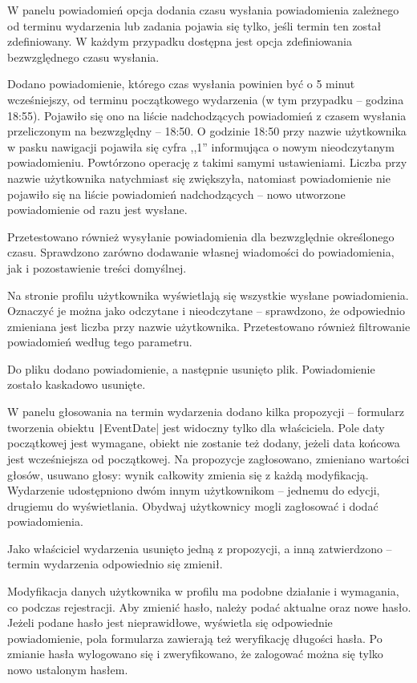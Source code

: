 \documentclass[a4paper,twoside,12pt]{book}
\begin{document}
W panelu powiadomień opcja dodania czasu wysłania powiadomienia zależnego od terminu wydarzenia lub zadania pojawia się tylko, jeśli termin ten został zdefiniowany. W każdym przypadku dostępna jest opcja zdefiniowania bezwzględnego czasu wysłania. 

Dodano powiadomienie, którego czas wysłania powinien być o 5 minut wcześniejszy, od terminu początkowego wydarzenia (w tym przypadku -- godzina 18:55). Pojawiło się ono na liście nadchodzących powiadomień z czasem wysłania przeliczonym na bezwzględny -- 18:50. O godzinie 18:50 przy nazwie użytkownika w pasku nawigacji pojawiła się cyfra ,,1'' informująca o nowym nieodczytanym powiadomieniu. Powtórzono operację z takimi samymi ustawieniami. Liczba przy nazwie użytkownika natychmiast się zwiększyła, natomiast powiadomienie nie pojawiło się na liście powiadomień nadchodzących -- nowo utworzone powiadomienie od razu jest wysłane. 

Przetestowano również wysyłanie powiadomienia dla bezwzględnie określonego czasu. Sprawdzono zarówno dodawanie własnej wiadomości do powiadomienia, jak i pozostawienie treści domyślnej.

Na stronie profilu użytkownika wyświetlają się wszystkie wysłane powiadomienia. Oznaczyć je można jako odczytane i nieodczytane -- sprawdzono, że odpowiednio zmieniana jest liczba przy nazwie użytkownika. Przetestowano również filtrowanie powiadomień według tego parametru.

Do pliku dodano powiadomienie, a następnie usunięto plik. Powiadomienie zostało kaskadowo usunięte.

W panelu głosowania na termin wydarzenia dodano kilka propozycji -- formularz tworzenia obiektu \texttt|EventDate| jest widoczny tylko dla właściciela. Pole daty początkowej jest wymagane, obiekt nie zostanie też dodany, jeżeli data końcowa jest wcześniejsza od początkowej. Na propozycje zagłosowano, zmieniano wartości głosów, usuwano głosy: wynik całkowity zmienia się z każdą modyfikacją. Wydarzenie udostępniono dwóm innym użytkownikom -- jednemu do edycji, drugiemu do wyświetlania. Obydwaj użytkownicy mogli zagłosować i dodać powiadomienia.

Jako właściciel wydarzenia usunięto jedną z propozycji, a inną zatwierdzono -- termin wydarzenia odpowiednio się zmienił.

Modyfikacja danych użytkownika w profilu ma podobne działanie i wymagania, co podczas rejestracji. Aby zmienić hasło, należy podać aktualne oraz nowe hasło. Jeżeli podane hasło jest nieprawidłowe, wyświetla się odpowiednie powiadomienie, pola formularza zawierają też weryfikację długości hasła. Po zmianie hasła wylogowano się i zweryfikowano, że zalogować można się tylko nowo ustalonym hasłem.
\end{document}
